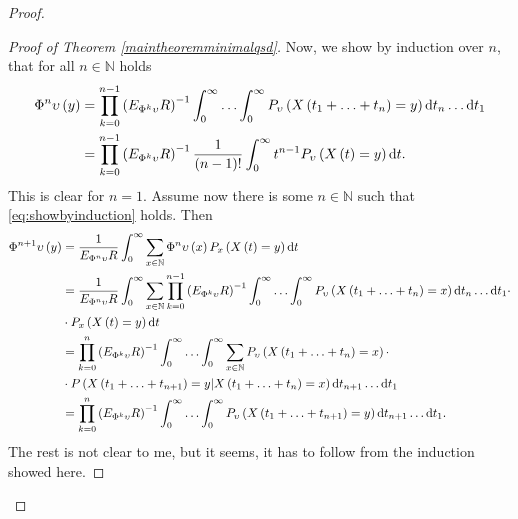 \documentclass[12pt,a4paper]{scrartcl}
\numberwithin{equation}{section}
\newcommand{\N}{\mathbb{N}} %
\begin{document}
\begin{proof}
\begin{proof}[Proof of Theorem \ref{maintheoremminimalqsd}]
Now, we show by induction over $n$, that for all $n \in \N$ holds
\begin{equation}\label{eq:showbyinduction}
\begin{aligned}
\Phi^n\upsilon\left(y\right) &= \prod_{k=0}^{n-1} \left(E_{\Phi^k\upsilon} R\right)^{-1} \int_0^{\infty}\ldots \int_0^{\infty} P_{\upsilon}\left(X\left(t_1+\ldots+t_n\right)=y\right) \textnormal{d}t_n \ldots \textnormal{d}t_1 \\
&=\prod_{k=0}^{n-1} \left(E_{\Phi^k\upsilon} R\right)^{-1} \frac{1}{\left(n-1\right)!}\int_0^{\infty} t^{n-1} P_{\upsilon}\left(X\left(t\right)=y\right) \textnormal{d}t.
\end{aligned}
\end{equation}
This is clear for $n=1.$ Assume now there is some $n \in \N$ such that \eqref{eq:showbyinduction} holds.
Then
\begin{align*}
\Phi^{n+1}\upsilon\left(y\right) &= \frac{1}{E_{\Phi^n\upsilon}R} \int_0^{\infty} \sum_{x \in \N} \Phi^n\upsilon\left(x\right) P_x\left(X\left(t\right) = y\right) \textnormal{d}t \\
&=\frac{1}{E_{\Phi^n\upsilon}R} \int_0^{\infty} \sum_{x \in \N} \prod_{k=0}^{n-1} \left(E_{\Phi^k\upsilon} R\right)^{-1} \int_0^{\infty}\ldots \int_0^{\infty} P_{\upsilon}\left(X\left(t_1+\ldots+t_n\right)=x\right) \textnormal{d}t_n \ldots \textnormal{d}t_1 \cdot \\
& \cdot P_x\left(X\left(t\right)=y\right) \textnormal{d}t \\
&=\prod_{k=0}^{n} \left(E_{\Phi^k\upsilon} R\right)^{-1} \int_0^{\infty} \ldots \int_0^{\infty} \sum_{x \in \N} P_{\upsilon}\left(X\left(t_1+\ldots+t_n\right)=x\right) \cdot \\
& \cdot P\left(X\left(t_1+\ldots+t_{n+1}\right)=y | X\left(t_1+\ldots+t_n\right)=x \right) \textnormal{d}t_{n+1} \ldots \textnormal{d}t_1 \\
&= \prod_{k=0}^{n} \left(E_{\Phi^k\upsilon} R\right)^{-1} \int_0^{\infty}\ldots \int_0^{\infty} P_{\upsilon}\left(X\left(t_1+\ldots+t_{n+1}\right)=y\right) \textnormal{d}t_{n+1} \ldots \textnormal{d}t_1.
\end{align*}
The rest is not clear to me, but it seems, it has to follow from the induction showed here.


\end{proof}
\end{proof}
\end{document}
